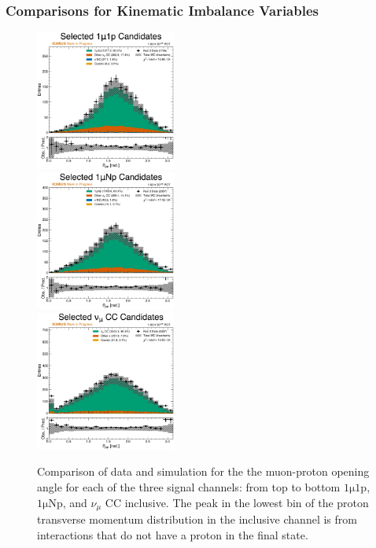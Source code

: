 \subsubsection{Comparisons for Kinematic Imbalance Variables}
\label{sec:datamc_kinematic_imbalance_variables}

\begin{figure}
    \centering
    \includegraphics[width=0.41\textwidth]{figures/data_mc_comparisons/datamc_hist1d_1mu1p_opening_angle.pdf}\\
    \includegraphics[width=0.41\textwidth]{figures/data_mc_comparisons/datamc_hist1d_1muNp_opening_angle.pdf}\\
    \includegraphics[width=0.41\textwidth]{figures/data_mc_comparisons/datamc_hist1d_1muX_opening_angle.pdf}\\
    \caption{Comparison of data and simulation for the the muon-proton opening angle for each of the three signal channels: from top to bottom $\mathrm{1\mu 1p}$, $\mathrm{1\mu Np}$, and $\nu_\mu$ CC inclusive. The peak in the lowest bin of the proton transverse momentum distribution in the inclusive channel is from interactions that do not have a proton in the final state.}
    \label{fig:datamc_opening_angle}
\end{figure}


